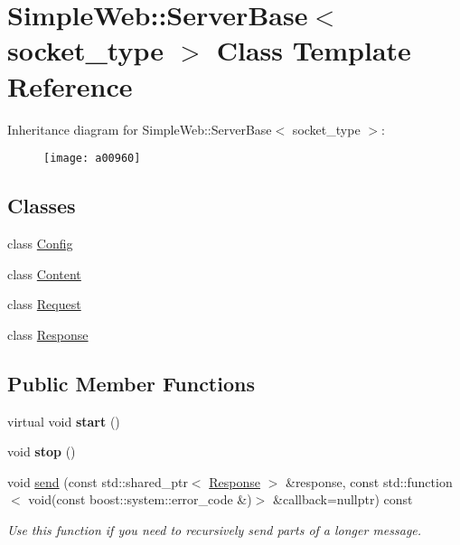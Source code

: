 \hypertarget{a00960}{}\section{Simple\+Web\+:\+:Server\+Base$<$ socket\+\_\+type $>$ Class Template Reference}
\label{a00960}
Inheritance diagram for Simple\+Web\+:\+:Server\+Base$<$ socket\+\_\+type $>$\+:\begin{figure}[H]
\begin{center}
\leavevmode
\texttt{[image: a00960]}
\end{center}
\end{figure}
\subsection*{Classes}
\begin{DoxyCompactItemize}
\item 
class \hyperlink{a00976}{Config}
\item 
class \hyperlink{a00968}{Content}
\item 
class \hyperlink{a00972}{Request}
\item 
class \hyperlink{a00964}{Response}
\end{DoxyCompactItemize}
\subsection*{Public Member Functions}
\begin{DoxyCompactItemize}
\item 
\mbox{\label{a00960_a759d6dae5fa77c47a36f7355fd33f8f7}} 
virtual void {\bfseries start} ()
\item 
\mbox{\label{a00960_a0667e44595f6c23016bee67c646ccc85}} 
void {\bfseries stop} ()
\item 
\mbox{\label{a00960_a93fd842b1a02dd63716ff0718f6069ce}} 
void \hyperlink{a00960_a93fd842b1a02dd63716ff0718f6069ce}{send} (const std\+::shared\+\_\+ptr$<$ \hyperlink{a00964}{Response} $>$ \&response, const std\+::function$<$ void(const boost\+::system\+::error\+\_\+code \&)$>$ \&callback=nullptr) const
\begin{DoxyCompactList}\small\item\em Use this function if you need to recursively send parts of a longer message. \end{DoxyCompactList}\end{DoxyCompactItemize}
